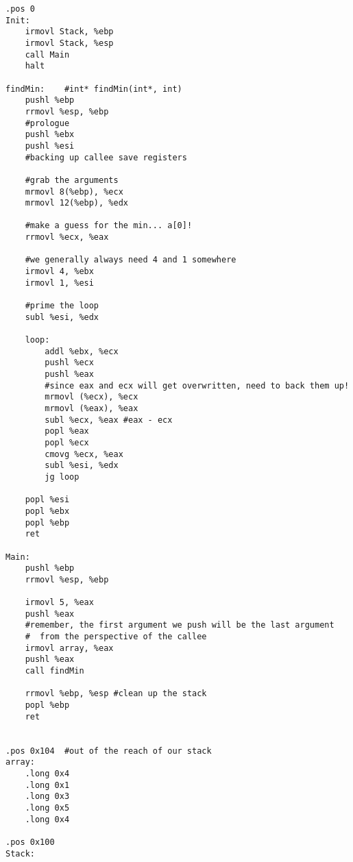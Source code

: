 \documentclass[10pt]{article}
\begin{document}
\begin{lstlisting}
.pos 0
Init:
    irmovl Stack, %ebp
    irmovl Stack, %esp
    call Main
    halt
    
findMin:    #int* findMin(int*, int)
    pushl %ebp
    rrmovl %esp, %ebp
    #prologue
    pushl %ebx
    pushl %esi
    #backing up callee save registers
    
    #grab the arguments
    mrmovl 8(%ebp), %ecx
    mrmovl 12(%ebp), %edx
    
    #make a guess for the min... a[0]!
    rrmovl %ecx, %eax
    
    #we generally always need 4 and 1 somewhere
    irmovl 4, %ebx
    irmovl 1, %esi
    
    #prime the loop
    subl %esi, %edx
    
    loop:
        addl %ebx, %ecx
        pushl %ecx
        pushl %eax
        #since eax and ecx will get overwritten, need to back them up!
        mrmovl (%ecx), %ecx
        mrmovl (%eax), %eax
        subl %ecx, %eax #eax - ecx
        popl %eax
        popl %ecx
        cmovg %ecx, %eax
        subl %esi, %edx
        jg loop
    
    popl %esi
    popl %ebx
    popl %ebp
    ret
    
Main:
    pushl %ebp
    rrmovl %esp, %ebp
    
    irmovl 5, %eax
    pushl %eax          
    #remember, the first argument we push will be the last argument 
    #  from the perspective of the callee
    irmovl array, %eax
    pushl %eax
    call findMin
    
    rrmovl %ebp, %esp #clean up the stack
    popl %ebp
    ret
    
    
.pos 0x104  #out of the reach of our stack
array:
    .long 0x4
    .long 0x1
    .long 0x3
    .long 0x5
    .long 0x4
    
.pos 0x100
Stack:
    
\end{lstlisting}
\end{document}

